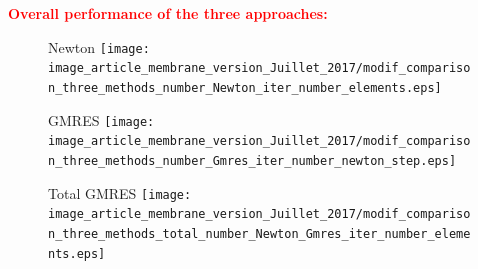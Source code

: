 \documentclass[10 pt]{beamer}
\begin{document}
\begin{frame}


\textcolor{red}{\textbf{Overall performance of the three approaches:}}
\begin{figure}[H]
\begin{minipage}[c]{.40\linewidth}
   \centering 
   Newton
\texttt{[image: image\_article\_membrane\_version\_Juillet\_2017/modif\_comparison\_three\_methods\_number\_Newton\_iter\_number\_elements.eps]}    
\end{minipage}\hfill
\begin{minipage}[c]{.40\linewidth}
\centering
GMRES
\texttt{[image: image\_article\_membrane\_version\_Juillet\_2017/modif\_comparison\_three\_methods\_number\_Gmres\_iter\_number\_newton\_step.eps]}    
\end{minipage} \hfill
\end{figure}
\begin{figure}
\vspace*{-0.04\textwidth} \hspace*{0.1\textwidth}
\begin{minipage}{.40\linewidth} 
\centering   Total GMRES
 \texttt{[image: image\_article\_membrane\_version\_Juillet\_2017/modif\_comparison\_three\_methods\_total\_number\_Newton\_Gmres\_iter\_number\_elements.eps]}     
\end{minipage} \hfill

\label{ref:figure:plot:number:alg:iter:per:newton:step}
\end{figure}
\end{frame}
%
\end{document}
